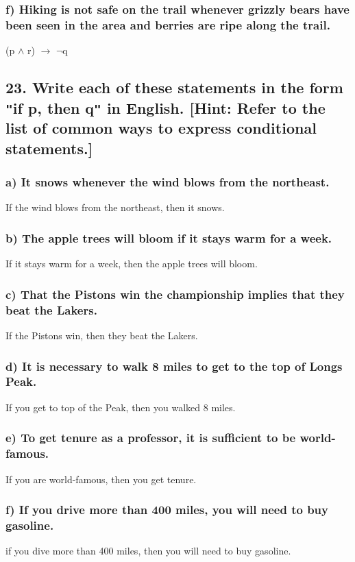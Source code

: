 \documentclass[11pt, oneside]{article} %
\numberwithin{equation}{section} %
\numberwithin{figure}{section} %
\numberwithin{table}{section} %
\begin{document}
\subsubsection{f) Hiking is not safe on the trail whenever grizzly bears have been seen in the area and berries are ripe along
the trail.}
(p $\wedge$ r) $\rightarrow$ $\neg$q

\subsection{23. Write each of these statements in the form \texttt{"}if p, then q\texttt{"} in English. [Hint: Refer to the list of common ways to express conditional statements.]}
\subsubsection{a) It snows whenever the wind blows from the northeast.}
If the wind blows from the northeast, then it snows.
\subsubsection{b) The apple trees will bloom if it stays warm for a week.}
If it stays warm for a week, then the apple trees will bloom.
\subsubsection{c) That the Pistons win the championship implies that
they beat the Lakers.}
If the Pistons win, then they beat the Lakers.
\subsubsection{d) It is necessary to walk 8 miles to get to the top of
Longs Peak.}
If you get to top of the Peak, then you walked 8 miles.
\subsubsection{e) To get tenure as a professor, it is sufficient to be world-
famous.}
If you are world-famous, then you get tenure.
\subsubsection{f) If you drive more than 400 miles, you will need to buy
gasoline.}
if you dive more than 400 miles, then you will need to buy gasoline.
\end{document}
